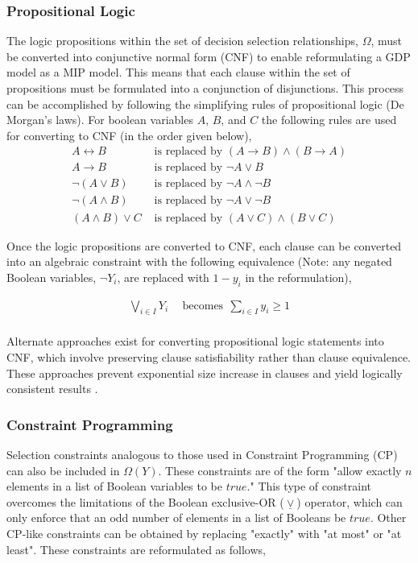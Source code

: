 \documentclass{juliacon}
\begin{document}
\subsubsection{Propositional Logic}
The logic propositions within the set of decision selection relationships, $\Omega$, must be converted into conjunctive normal form (CNF) to enable reformulating a GDP model as a MIP model. This means that each clause within the set of propositions must be formulated into a conjunction of disjunctions. This process can be accomplished by following the simplifying rules of propositional logic (De Morgan's laws). For boolean variables $A$, $B$, and $C$ the following rules are used for converting to CNF (in the order given below),
\begin{align*}
    A \leftrightarrow B & \text{ is replaced by } (A \rightarrow B) \land (B \rightarrow A) \\
    A \rightarrow B & \text{ is replaced by } \lnot A \lor B \\
    \lnot(A \lor B) & \text{ is replaced by } \lnot A \land \lnot B \\
    \lnot(A \land B) & \text{ is replaced by } \lnot A \lor \lnot B \\
    (A \land B) \lor C & \text{ is replaced by } (A \lor C) \land (B \lor C)
\end{align*}

Once the logic propositions are converted to CNF, each clause can be converted into an algebraic constraint with the following equivalence (Note: any negated Boolean variables, $\neg Y_i$, are replaced with $1-y_i$ in the reformulation),

\begin{align*}
    \bigvee_{i \in I} Y_i & \ \ \text{becomes} \ \ \sum_{i\in I} y_i \geq 1 \\
\end{align*}

Alternate approaches exist for converting propositional logic statements into CNF, which involve preserving clause satisfiability rather than clause equivalence. These approaches prevent exponential size increase in clauses and yield logically consistent results \cite{jackson_sheridan_2005}.

\subsubsection{Constraint Programming}
Selection constraints analogous to those used in Constraint Programming (CP) can also be included in $\Omega(Y)$. These constraints are of the form "allow exactly $n$ elements in a list of Boolean variables to be $true$." This type of constraint overcomes the limitations of the Boolean exclusive-OR ($\underline{\vee}$) operator, which can only enforce that an odd number of elements in a list of Booleans be $true$. Other CP-like constraints can be obtained by replacing "exactly" with "at most" or "at least". These constraints are reformulated as follows,
\end{document}
